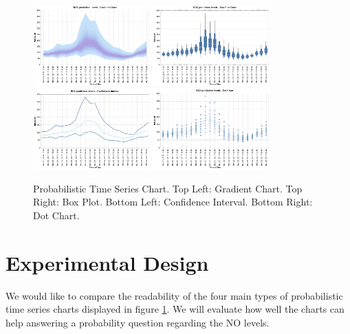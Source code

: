\documentclass[a4paper,3p,sort&compress]{elsarticle}
\begin{document}
\begin{figure}
  \centering
  \includegraphics[width=0.4\textwidth]{gradient} 
  \includegraphics[width=0.4\textwidth]{boxplot}
  \includegraphics[width=0.4\textwidth]{ci} 
  \includegraphics[width=0.4\textwidth]{dot}
  \caption{\label{figure:charts} Probabilistic Time Series Chart. 
  Top Left: Gradient Chart. Top Right: Box Plot. 
  Bottom Left: Confidence Interval. Bottom Right: Dot Chart.  }
\end{figure}

\section{Experimental Design}
\label{sec:exp_design}

We would like to compare the readability of the four main types of probabilistic time series charts displayed in figure 
\ref{figure:charts}. We will evaluate how well the charts can help answering a probability question regarding the NO levels.
\end{document}
